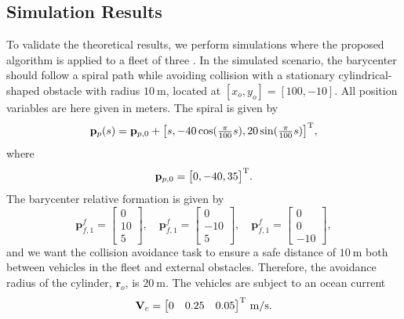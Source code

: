 \subsection{Simulation Results}\label{sec:simulation}
To validate the theoretical results, we perform simulations where the proposed algorithm is applied to a fleet of three  \cite{sousa_LAUV_2012}. In the simulated scenario, the barycenter should follow a spiral path while avoiding collision with a stationary cylindrical-shaped obstacle with radius $\SI{10}{\meter}$, located at $[x_o,y_o] = [100,-10]$. All position variables are here given in meters. The spiral is given by
\begin{equation}
    \mathbf{p}_p(s) = \mathbf{p}_{p,0} + \bigl[s, -40 \cos(\tfrac{\pi}{100} s), 20 \sin(\tfrac{\pi}{100} s)\bigr]^{\mathrm{T}},
\end{equation}
where \begin{equation}
    \mathbf{p}_{p,0} = \bigl[ 0, -40, 35 \bigr]^{\mathrm{T}}.
\end{equation}
The barycenter relative formation is given by
\begin{equation}
    \mathbf{p}_{f,1}^f = \begin{bmatrix}0 \\ 10 \\ 5\end{bmatrix}, \quad \mathbf{p}_{f,1}^f = \begin{bmatrix}0 \\ -10 \\ 5\end{bmatrix},\quad \mathbf{p}_{f,1}^f = \begin{bmatrix}0 \\ 0 \\ -10\end{bmatrix},
\end{equation}
and we want the collision avoidance task to ensure a safe distance of $\SI{10}{\meter}$ both between vehicles in the fleet and external obstacles. Therefore, the avoidance radius of the cylinder, $\mathbf{r}_o$, is $\SI{20}{\meter}$. The vehicles are subject to an ocean current 
\begin{equation}
    \mathbf{V}_c = \begin{bmatrix}
        0 & 0.25 & 0.05
    \end{bmatrix}^{\mathrm{T}} \,\mathrm{m/s}.
\end{equation}

